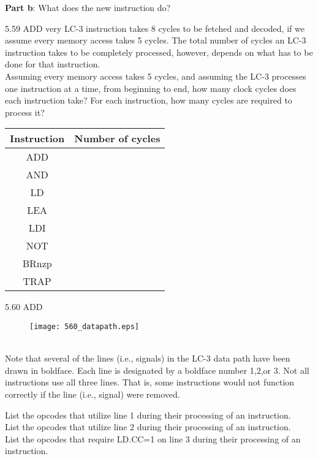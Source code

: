 \documentclass{patt}
\begin{document}
\begin{exercises}
\noindent
{\bf Part b}:
What does the new instruction do? \\

\FloatBarrier

\item[5.59]ADD very LC-3 instruction takes 8 cycles to be fetched and decoded, if we assume every memory access takes 5 cycles.  The total number of cycles an LC-3 instruction takes to be completely processed, however, depends on what has to be done for that
instruction. \\

\noindent
Assuming every memory access takes 5 cycles, and assuming the LC-3 processes
one instruction at a time, from beginning to end, how many clock cycles does
each instruction take? For each instruction, how many cycles are required to process it? \\

\begin{center}
\begin{tabular}{|c|c|}
\hline
 Instruction & Number of cycles \\ \hline \hline
 ADD & \\
 AND & \\
 LD & \\
 LEA & \\
 LDI & \\
 NOT & \\
 BRnzp & \\
 TRAP & \\ \hline
\end{tabular}
\end{center}

\item[5.60]ADD 
\begin{figure}[h!]
\centering
\texttt{[image: 560\_datapath.eps]}
\end{figure}
\\

\noindent Note that several of the lines (i.e., signals) in the
LC-3 data path have been drawn in boldface.  Each line is designated by a
boldface number 1,2,or 3.  Not all instructions use all three lines. That is, some
instructions would not function correctly if the line (i.e., signal) were
removed.

List the opcodes that utilize line 1 during their processing of an instruction.\\
List the opcodes that utilize line 2 during their processing of an instruction.\\
List the opcodes that require LD.CC=1 on line 3 during their processing of an instruction.\\


\end{exercises}
\end{document}
